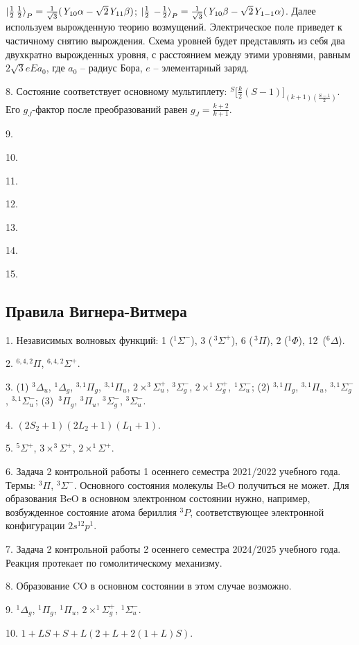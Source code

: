$\ket{ \frac12 \,  \frac12}_P = \frac{1}{\sqrt3}(\textit{Y}_{10}\alpha - \sqrt2 \textit{Y}_{11} \beta) $; $\ket{ \frac12\,-\!\frac{1}{2}}_P =  \frac{1}{\sqrt3}(\textit{Y}_{10}\beta - \sqrt2 \textit{Y}_{1-1} \alpha)$. Далее используем вырожденную теорию возмущений. Электрическое поле приведет к частичному снятию вырождения. Схема уровней будет представлять из себя два двухкратно вырожденных уровня, с расстоянием между этими уровнями, равным $2\sqrt3 eEa_0$, где $a_0$ – радиус Бора, $e$ – элементарный заряд.\par
8. Состояние соответствует основному мультиплету: $^S \Big[ \frac k2 (S-1) \Big]_{(k+1)(\frac{S-1}{2})}$. Его $g_J$-фактор после преобразований равен $g_{J} = \frac{k+2}{k+1}$.\par
9. \par
10. \par
11. \par
12. \par
13. \par
14. \par
15. \par
\newpage

\subsection{Правила Вигнера-Витмера}
1. Независимых волновых функций: 1 ($^1\Sigma^-$), 3 ($\,^3\Sigma^+$), 6 ($\,^3\Pi$), 2 ($^1\Phi$), 12~($^6\Delta$). \par
2.  $^{6,4,2}\Pi$,  $^{6,4,2}\Sigma^+$.\par
3. (1) $^3\Delta_u$, $^1\Delta_g$, $^{3,1}\Pi_g$, $^{3,1}\Pi_u$, $2 \times ^{3}\Sigma_u^+$, $^3\Sigma^-_g$, $2 \times ^{1}\Sigma_g^+$, $^{1}\Sigma_u^-$; (2) $^{3,1}\Pi_g$, $^{3,1}\Pi_u$, $^{3,1}\Sigma^-_g$, $^{3,1}\Sigma^-_u$; (3)~$^3\Pi_g$, $^3\Pi_u$, $^3\Sigma^-_g$, $^3\Sigma^-_u$.\par
4. $(2S_2+1)(2L_2+1)(L_1+1).$\par
5.  $^{5}\Sigma^+$, $3 \times ^{3}\Sigma^+$, $2 \times ^{1}\Sigma^+$.\par
6. Задача 2 контрольной работы 1 осеннего семестра 2021/2022 учебного года. Термы: $^3\Pi$, $^3\Sigma^-$. Основного состояния молекулы BeO получиться не может. Для образования BeO в основном электронном состоянии нужно, например, возбужденное состояние атома бериллия $^3P$, соответствующее электронной конфигурации $2s^12p^1$.\par
7. Задача 2 контрольной работы 2 осеннего семестра 2024/2025 учебного года. Реакция протекает по гомолитическому механизму.\par
8. Образование CO в основном состоянии в этом случае возможно.\par
9. $^1\Delta_g$, $^1\Pi_g$, $^1\Pi_u$, $2 \times ^1\Sigma^+_g$, $^1\Sigma^-_u$.\par
10. $1 + LS + S + L(2 + L + 2(1 + L)S)$.\par
\newpage

